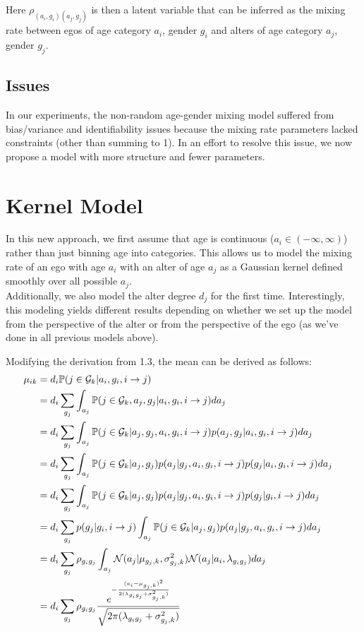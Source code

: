 \documentclass[12pt]{article}
\begin{document}
\noindent Here $\rho_{(a_i,g_i)(a_j,g_j)}$ is then a latent variable that can be inferred as the mixing rate between egos of age category $a_i$, gender $g_i$ and alters of age category $a_j$, gender $g_j$.

\subsection{Issues}
In our experiments, the non-random age-gender mixing model suffered from bias/variance and identifiability issues because the mixing rate parameters lacked constraints (other than summing to 1). In an effort to resolve this issue, we now propose a model with more structure and fewer parameters.

\pagebreak
\section{Kernel Model}
In this new approach, we first assume that age is continuous ($a_i \in (-\infty,\infty)$) rather than just binning age into categories. This allows us to model the mixing rate of an ego with age $a_i$ with an alter of age $a_j$ as a Gaussian kernel defined smoothly over all possible $a_j$.\\

\noindent Additionally, we also model the alter degree $d_j$ for the first time. Interestingly, this modeling yields different results depending on whether we set up the model from the perspective of the alter or from the perspective of the ego (as we've done in all previous models above). 

\noindent Modifying the derivation from 1.3, the mean can be derived as follows:
\begin{align}
\mu_{ik} 
&= d_i \mathbb{P}( j \in \mathcal{G}_k | a_i, g_i, i \to j) 
&& \\\nonumber
&= d_i \sum_{g_j} \int_{a_j} \mathbb{P}( j \in \mathcal{G}_k, a_j, g_j | a_i, g_i, i \to j) da_j 
&& \\\nonumber
&= d_i \sum_{g_j} \int_{a_j} \mathbb{P}( j \in \mathcal{G}_k | a_j, g_j, a_i, g_i, i \to j) p(a_j, g_j | a_i, g_i, i \to j) da_j 
&& \\\nonumber
&= d_i \sum_{g_j} \int_{a_j} \mathbb{P}( j \in \mathcal{G}_k | a_j, g_j) p(a_j | g_j, a_i, g_i, i \to j) p(g_j | a_i, g_i, i \to j) da_j 
&& \\\nonumber
&= d_i \sum_{g_j} \int_{a_j}  \mathbb{P}( j \in \mathcal{G}_k | a_j, g_j) 
p(a_j | g_j, a_i, g_i, i \to j) p(g_j | g_i, i \to j) da_j 
&& \\\nonumber
&= d_i \sum_{g_j} p(g_j | g_i, i \to j) 
\int_{a_j}  \mathbb{P}( j \in \mathcal{G}_k | a_j, g_j) p(a_j | g_j, a_i, g_i, i \to j) da_j 
&& \\\nonumber
&= d_i \sum_{g_j} \rho_{g_ig_j} 
\int_{a_j} \mathcal{N}(a_j | \mu_{g_j,k}, \sigma_{g_j,k}^2)
\mathcal{N}(a_j | a_i, \lambda_{g_ig_j}) da_j 
&& \\\nonumber
&= d_i \sum_{g_j} \rho_{g_ig_j} 
\frac{ e^{ -\frac{ (a_i - \mu_{g_j,k})^2 }{ 2(\lambda_{g_ig_j} + \sigma_{g_j,k}^2) } } }{ \sqrt{ 2\pi(\lambda_{g_ig_j} + \sigma_{g_j,k}^2) } }
\end{align}
\end{document}
